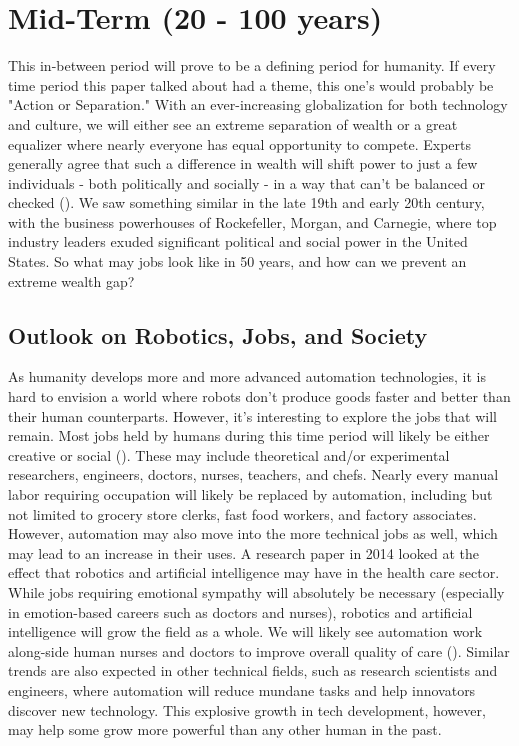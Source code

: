 \section{Mid-Term (20 - 100 years)}
\label{sec:mid}
This in-between period will prove to be a defining period for humanity. If every time period this paper talked about had a theme, this one's would probably be "Action or Separation." With an ever-increasing globalization for both technology and culture, we will either see an extreme separation of wealth or a great equalizer where nearly everyone has equal opportunity to compete. Experts generally agree that such a difference in wealth will shift power to just a few individuals - both politically and socially - in a way that can't be balanced or checked (\cite{WhatsWrongWithWealthDistribution}). We saw something similar in the late 19th and early 20th century, with the business powerhouses of Rockefeller, Morgan, and Carnegie, where top industry leaders exuded significant political and social power in the United States. So what may jobs look like in 50 years, and how can we prevent an extreme wealth gap?

\subsection{Outlook on Robotics, Jobs, and Society}

As humanity develops more and more advanced automation technologies, it is hard to envision a world where robots don't produce goods faster and better than their human counterparts. However, it's interesting to explore the jobs that will remain. Most jobs held by humans during this time period will likely be either creative or social (\cite{JobsNoAI}). These may include theoretical and/or experimental researchers, engineers, doctors, nurses, teachers, and chefs. Nearly every manual labor requiring occupation will likely be replaced by automation, including but not limited to grocery store clerks, fast food workers, and factory associates. However, automation may also move into the more technical jobs as well, which may lead to an increase in their uses. A research paper in 2014 looked at the effect that robotics and artificial intelligence may have in the health care sector. While jobs requiring emotional sympathy will absolutely be necessary (especially in emotion-based careers such as doctors and nurses), robotics and artificial intelligence will grow the field as a whole. We will likely see automation work along-side human nurses and doctors to improve overall quality of care (\cite{FutureMedicalRobotics}). Similar trends are also expected in other technical fields, such as research scientists and engineers, where automation will reduce mundane tasks and help innovators discover new technology. This explosive growth in tech development, however, may help some grow more powerful than any other human in the past.

